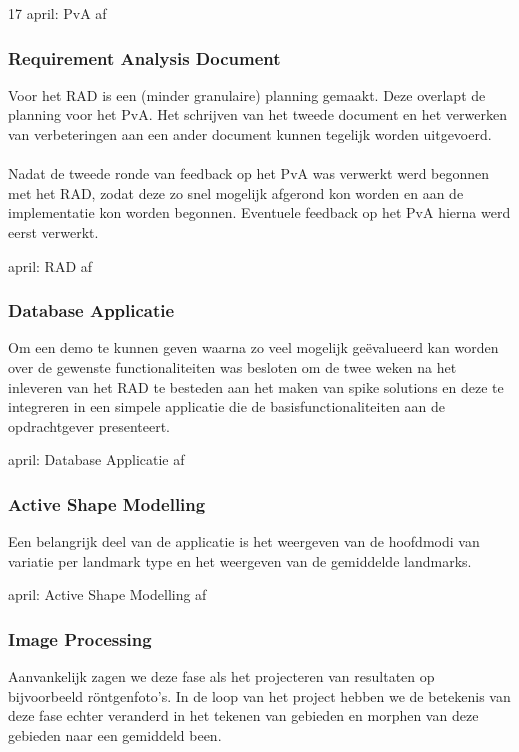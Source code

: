 17 april: PvA af

\subsubsection{Requirement Analysis Document}
Voor het RAD is een (minder granulaire) planning gemaakt. Deze overlapt
de planning voor het PvA. Het schrijven van het tweede document en
het verwerken van verbeteringen aan een ander document kunnen tegelijk worden
uitgevoerd.
\\
\\
Nadat de tweede ronde van feedback op het PvA was verwerkt werd begonnen met
het RAD, zodat deze zo snel mogelijk afgerond kon worden en aan de
implementatie kon worden begonnen. Eventuele feedback op het PvA hierna werd
eerst verwerkt.

 april: RAD af

\subsubsection{Database Applicatie}
Om een demo te kunnen geven waarna zo veel mogelijk ge\"{e}valueerd kan worden
over de gewenste functionaliteiten was besloten om de twee weken na het
inleveren van het RAD te besteden aan het maken van spike solutions en deze te
integreren in een simpele applicatie die de basisfunctionaliteiten aan de
opdrachtgever presenteert.

 april: Database Applicatie af

\subsubsection{Active Shape Modelling}
Een belangrijk deel van de applicatie is het weergeven van de hoofdmodi van
variatie per landmark type en het weergeven van de gemiddelde landmarks.

 april: Active Shape Modelling af

\subsubsection{Image Processing}
Aanvankelijk zagen we deze fase als het projecteren van resultaten op
bijvoorbeeld r\"{o}ntgenfoto's. In de loop van het project hebben we de
betekenis van deze fase echter veranderd in het tekenen van gebieden en
morphen van deze gebieden naar een gemiddeld been. 

